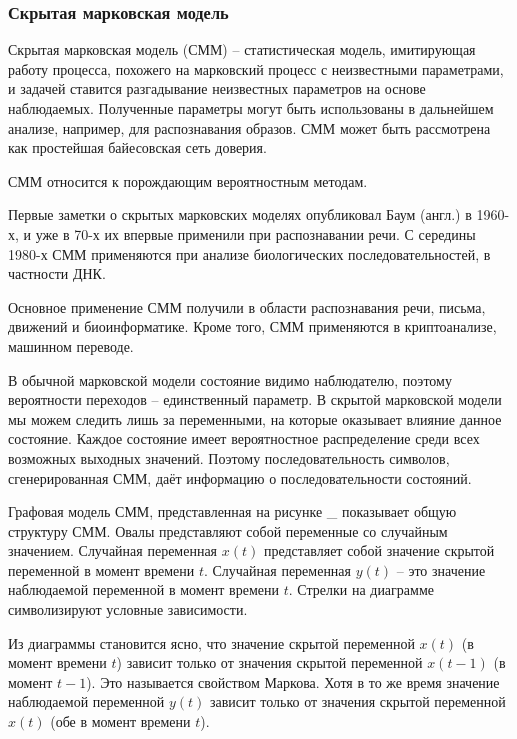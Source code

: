 \subsubsection*{Скрытая марковская модель}
Скрытая марковская модель (СММ) -- статистическая модель, имитирующая работу процесса, похожего на марковский процесс с неизвестными параметрами, и задачей ставится разгадывание неизвестных параметров на основе наблюдаемых. Полученные параметры могут быть использованы в дальнейшем анализе, например, для распознавания образов. СММ может быть рассмотрена как простейшая байесовская сеть доверия.

СММ относится к порождающим вероятностным методам.

Первые заметки о скрытых марковских моделях опубликовал Баум (англ.) в 1960-х, и уже в 70-х их впервые применили при распознавании речи. С середины 1980-х СММ применяются при анализе биологических последовательностей, в частности ДНК.

Основное применение СММ получили в области распознавания речи, письма, движений и биоинформатике. Кроме того, СММ применяются в криптоанализе, машинном переводе.

В обычной марковской модели состояние видимо наблюдателю, поэтому вероятности переходов -- единственный параметр. В скрытой марковской модели мы можем следить лишь за переменными, на которые оказывает влияние данное состояние. Каждое состояние имеет вероятностное распределение среди всех возможных выходных значений. Поэтому последовательность символов, сгенерированная СММ, даёт информацию о последовательности состояний.

Графовая модель СММ, представленная на рисунке \_ показывает общую структуру СММ. Овалы представляют собой переменные со случайным значением. Случайная переменная \( x(t) \) представляет собой значение скрытой переменной в момент времени \( t \). Случайная переменная \( y(t) \) -- это значение наблюдаемой переменной в момент времени \( t \). Стрелки на диаграмме символизируют условные зависимости.

Из диаграммы становится ясно, что значение скрытой переменной \( x(t) \) (в момент времени \( t \)) зависит только от значения скрытой переменной \( x(t-1) \) (в момент \( t-1 \)). Это называется свойством Маркова. Хотя в то же время значение наблюдаемой переменной \( y(t) \) зависит только от значения скрытой переменной \( x(t) \) (обе в момент времени \( t \)).

\begin{center}
\end{center}

